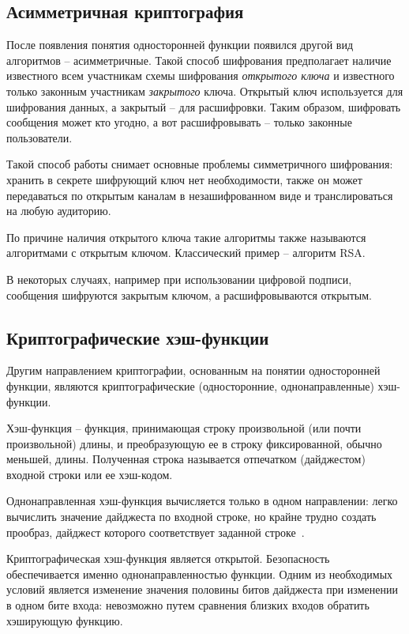 \subsection{Асимметричная криптография} %

После появления понятия односторонней функции появился другой вид алгоритмов – асимметричные. Такой способ шифрования предполагает наличие известного всем участникам схемы шифрования \textit{открытого ключа} и известного только законным участникам \textit{закрытого} ключа. Открытый ключ используется для шифрования данных, а закрытый – для расшифровки. Таким образом, шифровать сообщения может кто угодно, а вот расшифровывать – только законные пользователи.

Такой способ работы снимает основные проблемы симметричного шифрования: хранить в секрете шифрующий ключ нет необходимости, также он может передаваться по открытым каналам в незашифрованном виде и транслироваться на любую аудиторию.

По причине наличия открытого ключа такие алгоритмы также называются алгоритмами с открытым ключом. Классический пример – алгоритм RSA.

В некоторых случаях, например при использовании цифровой подписи, сообщения шифруются закрытым ключом, а расшифровываются открытым. 

\subsection{Криптографические хэш-функции} %

Другим направлением криптографии, основанным на понятии односторонней функции, являются криптографические (односторонние, однонаправленные) хэш-функции.

Хэш-функция – функция, принимающая строку произвольной (или почти произвольной) длины, и преобразующую ее в строку фиксированной, обычно меньшей, длины. Полученная строка называется отпечатком (дайджестом) входной строки или ее хэш-кодом.

Однонаправленная хэш-функция вычисляется только в одном направлении: легко вычислить значение дайджеста по входной строке, но крайне трудно создать прообраз, дайджест которого соответствует заданной строке~\cite{src15}.

Криптографическая хэш-функция является открытой. Безопасность обеспечивается именно однонаправленностью функции. Одним из необходимых условий является изменение значения половины битов дайджеста при изменении в одном бите входа: невозможно путем сравнения близких входов обратить хэширующую функцию.


